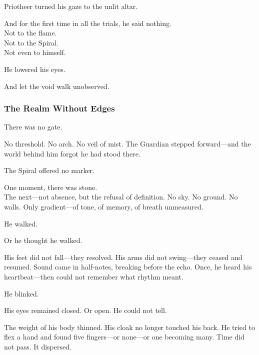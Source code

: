 \documentclass[12pt]{article}
\begin{document}
\vspace{0.5em}
Priotheer turned his gaze to the unlit altar.

\vspace{0.5em}
And for the first time in all the trials, he said nothing.\\
Not to the flame.\\
Not to the Spiral.\\
Not even to himself.

\vspace{0.5em}
He lowered his eyes.

\vspace{0.5em}
And let the void walk unobserved.

\dotfill

\subsubsection*{The Realm Without Edges}

There was no gate.

\vspace{0.5em}
No threshold. No arch. No veil of mist. The Guardian stepped forward---and the world behind him forgot he had stood there.

\vspace{0.5em}
The Spiral offered no marker.

\vspace{0.5em}
One moment, there was stone.\\
The next---not absence, but the refusal of definition. No sky. No ground. No walls. Only gradient---of tone, of memory, of breath unmeasured.

\vspace{0.5em}
He walked.

\vspace{0.5em}
Or he thought he walked.

\vspace{0.5em}
His feet did not fall---they resolved. His arms did not swing---they ceased and resumed. Sound came in half-notes, breaking before the echo. Once, he heard his heartbeat---then could not remember what rhythm meant.

\vspace{0.5em}
He blinked.

\vspace{0.5em}
His eyes remained closed. Or open. He could not tell.

\vspace{0.5em}
The weight of his body thinned. His cloak no longer touched his back. He tried to flex a hand and found five fingers---or none---or one becoming many. Time did not pass. It dispersed.
\end{document}
